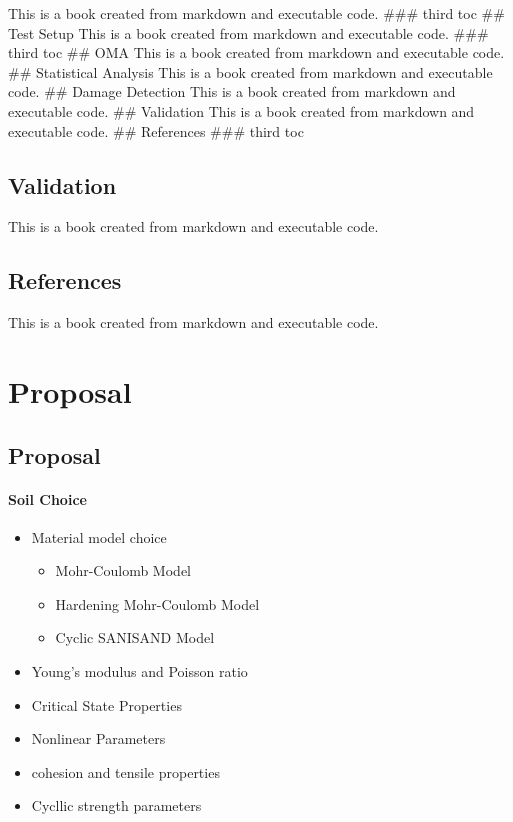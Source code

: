 \documentclass[
  letterpaper,
  DIV=11,
  numbers=noendperiod]{scrreprt}
\providecommand{\tightlist}{%
  \setlength{\itemsep}{0pt}\setlength{\parskip}{0pt}}\usepackage{longtable,booktabs,array}
\begin{document}
This is a book created from markdown and executable code. \#\#\# third
toc \#\# Test Setup This is a book created from markdown and executable
code. \#\#\# third toc \#\# OMA This is a book created from markdown and
executable code. \#\# Statistical Analysis This is a book created from
markdown and executable code. \#\# Damage Detection This is a book
created from markdown and executable code. \#\# Validation This is a
book created from markdown and executable code. \#\# References \#\#\#
third toc

\hypertarget{validation-1}{%
\chapter{Validation}\label{validation-1}}

This is a book created from markdown and executable code.

\hypertarget{references-2}{%
\chapter{References}\label{references-2}}

This is a book created from markdown and executable code.

\part{Proposal}

\hypertarget{proposal-1}{%
\chapter{Proposal}\label{proposal-1}}

\hypertarget{soil-choice}{%
\subsection{Soil Choice}\label{soil-choice}}

\begin{itemize}
\tightlist
\item
  Material model choice

  \begin{itemize}
  \tightlist
  \item
    Mohr-Coulomb Model
  \item
    Hardening Mohr-Coulomb Model
  \item
    Cyclic SANISAND Model
  \end{itemize}
\item
  Young's modulus and Poisson ratio
\item
  Critical State Properties
\item
  Nonlinear Parameters
\item
  cohesion and tensile properties
\item
  Cycllic strength parameters
\end{itemize}
\end{document}
